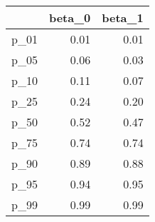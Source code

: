 \begin{table}[ht]
\centering
\begin{tabular}{rrr}
  \hline
 & beta\_0 & beta\_1 \\ 
  \hline
p\_01 & 0.01 & 0.01 \\ 
  p\_05 & 0.06 & 0.03 \\ 
  p\_10 & 0.11 & 0.07 \\ 
  p\_25 & 0.24 & 0.20 \\ 
  p\_50 & 0.52 & 0.47 \\ 
  p\_75 & 0.74 & 0.74 \\ 
  p\_90 & 0.89 & 0.88 \\ 
  p\_95 & 0.94 & 0.95 \\ 
  p\_99 & 0.99 & 0.99 \\ 
   \hline
\end{tabular}
\end{table}
